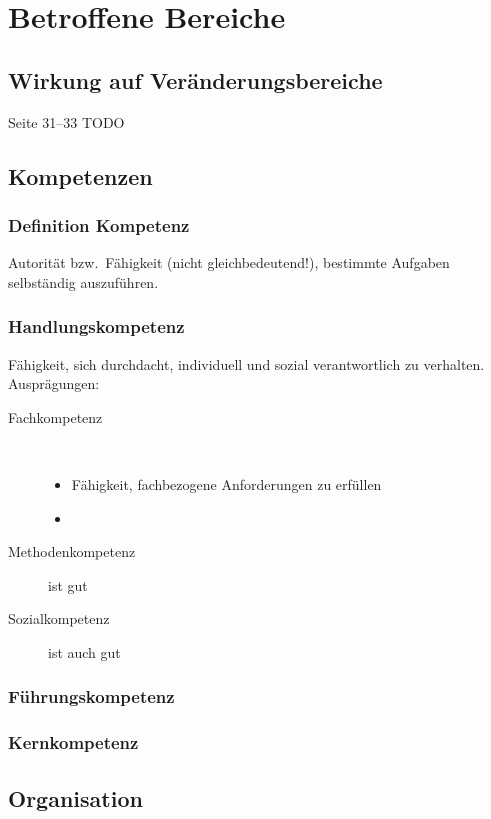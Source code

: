 \documentclass[a4paper, 12pt]{article}
\begin{document}
\section{Betroffene Bereiche}


\subsection{Wirkung auf Veränderungsbereiche}
Seite 31--33 TODO


\subsection{Kompetenzen}

\subsubsection*{Definition Kompetenz}
Autorität bzw.\ Fähigkeit (nicht gleichbedeutend!), bestimmte Aufgaben selbständig auszuführen.


\subsubsection*{Handlungskompetenz}
Fähigkeit, sich durchdacht, individuell und sozial verantwortlich zu verhalten. Ausprägungen:
\begin{description}
  \item[Fachkompetenz]~
    \begin{itemize}
    \item Fähigkeit, fachbezogene Anforderungen zu erfüllen
    \item 
    \end{itemize}
  \item[Methodenkompetenz] ist gut
  \item[Sozialkompetenz] ist auch gut
\end{description}

\subsubsection*{Führungskompetenz}

\subsubsection*{Kernkompetenz}


\subsection{Organisation}
\end{document}
